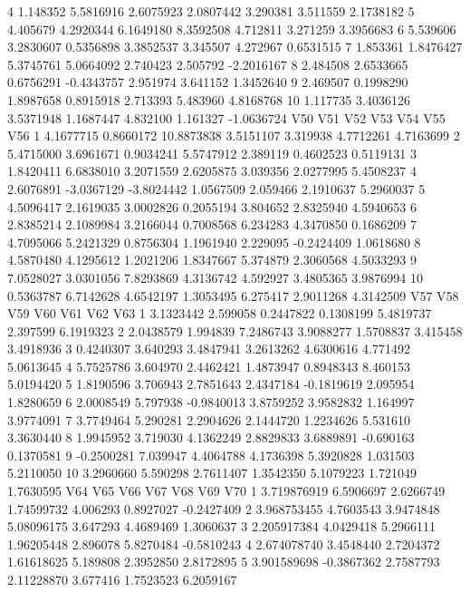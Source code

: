 \documentclass[12pt]{article}
\begin{document}
\begin{Schunk}
\begin{Soutput}
4  1.148352 5.5816916 2.6075923  2.0807442 3.290381 3.511559  2.1738182
5  4.405679 4.2920344 6.1649180  8.3592508 4.712811 3.271259  3.3956683
6  5.539606 3.2830607 0.5356898  3.3852537 3.345507 4.272967  0.6531515
7  1.853361 1.8476427 5.3745761  5.0664092 2.740423 2.505792 -2.2016167
8  2.484508 2.6533665 0.6756291 -0.4343757 2.951974 3.641152  1.3452640
9  2.469507 0.1998290 1.8987658  0.8915918 2.713393 5.483960  4.8168768
10 1.117735 3.4036126 3.5371948  1.1687447 4.832100 1.161327 -1.0636724
         V50        V51        V52       V53      V54        V55       V56
1  4.1677715  0.8660172 10.8873838 3.5151107 3.319938  4.7712261 4.7163699
2  5.4715000  3.6961671  0.9034241 5.5747912 2.389119  0.4602523 0.5119131
3  1.8420411  6.6838010  3.2071559 2.6205875 3.039356  2.0277995 5.4508237
4  2.6076891 -3.0367129 -3.8024442 1.0567509 2.059466  2.1910637 5.2960037
5  4.5096417  2.1619035  3.0002826 0.2055194 3.804652  2.8325940 4.5940653
6  2.8385214  2.1089984  3.2166044 0.7008568 6.234283  4.3470850 0.1686209
7  4.7095066  5.2421329  0.8756304 1.1961940 2.229095 -0.2424409 1.0618680
8  4.5870480  4.1295612  1.2021206 1.8347667 5.374879  2.3060568 4.5033293
9  7.0528027  3.0301056  7.8293869 4.3136742 4.592927  3.4805365 3.9876994
10 0.5363787  6.7142628  4.6542197 1.3053495 6.275417  2.9011268 4.3142509
          V57      V58        V59       V60        V61       V62       V63
1   3.1323442 2.599058  0.2447822 0.1308199  5.4819737  2.397599 6.1919323
2   2.0438579 1.994839  7.2486743 3.9088277  1.5708837  3.415458 3.4918936
3   0.4240307 3.640293  3.4847941 3.2613262  4.6300616  4.771492 5.0613645
4   5.7525786 3.604970  2.4462421 1.4873947  0.8948343  8.460153 5.0194420
5   1.8190596 3.706943  2.7851643 2.4347184 -0.1819619  2.095954 1.8280659
6   2.0008549 5.797938 -0.9840013 3.8759252  3.9582832  1.164997 3.9774091
7   3.7749464 5.290281  2.2904626 2.1444720  1.2234626  5.531610 3.3630440
8   1.9945952 3.719030  4.1362249 2.8829833  3.6889891 -0.690163 0.1370581
9  -0.2500281 7.039947  4.4064788 4.1736398  5.3920828  1.031503 5.2110050
10  3.2960660 5.590298  2.7611407 1.3542350  5.1079223  1.721049 1.7630595
            V64        V65        V66         V67      V68       V69        V70
1   3.719876919  6.5906697  2.6266749  1.74599732 4.006293 0.8927027 -0.2427409
2   3.968753455  4.7603543  3.9474848  5.08096175 3.647293 4.4689469  1.3060637
3   2.205917384  4.0429418  5.2966111  1.96205448 2.896078 5.8270484 -0.5810243
4   2.674078740  3.4548440  2.7204372  1.61618625 5.189808 2.3952850  2.8172895
5   3.901589698 -0.3867362  2.7587793  2.11228870 3.677416 1.7523523  6.2059167

\end{Soutput}
\end{Schunk}
\end{document}
